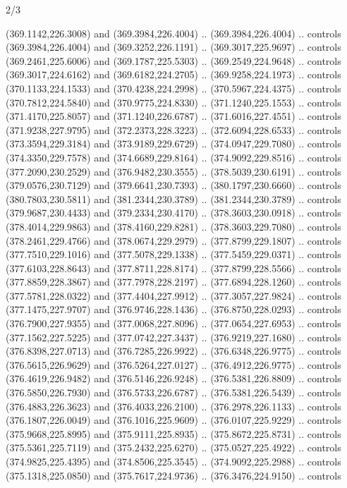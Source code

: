 \begin{flagdescription}{2/3}
\begin{scope}[xshift=0.5\flaglength,yshift=0.5\flagwidth,scale=\flagwidth/495.65]
\begin{scope}[y=0.8pt, x=0.8pt, yscale=-1,shift={(-463.76,-309.78)}]
  (369.1142,226.3008) and (369.3984,226.4004) .. (369.3984,226.4004) .. controls
  (369.3984,226.4004) and (369.3252,226.1191) .. (369.3017,225.9697) .. controls
  (369.2461,225.6006) and (369.1787,225.5303) .. (369.2549,224.9648) .. controls
  (369.3017,224.6162) and (369.6182,224.2705) .. (369.9258,224.1973) .. controls
  (370.1133,224.1533) and (370.4238,224.2998) .. (370.5967,224.4375) .. controls
  (370.7812,224.5840) and (370.9775,224.8330) .. (371.1240,225.1553) .. controls
  (371.4170,225.8057) and (371.1240,226.6787) .. (371.6016,227.4551) .. controls
  (371.9238,227.9795) and (372.2373,228.3223) .. (372.6094,228.6533) .. controls
  (373.3594,229.3184) and (373.9189,229.6729) .. (374.0947,229.7080) .. controls
  (374.3350,229.7578) and (374.6689,229.8164) .. (374.9092,229.8516) .. controls
  (377.2090,230.2529) and (376.9482,230.3555) .. (378.5039,230.6191) .. controls
  (379.0576,230.7129) and (379.6641,230.7393) .. (380.1797,230.6660) .. controls
  (380.7803,230.5811) and (381.2344,230.3789) .. (381.2344,230.3789) .. controls
  (379.9687,230.4433) and (379.2334,230.4170) .. (378.3603,230.0918) .. controls
  (378.4014,229.9863) and (378.4160,229.8281) .. (378.3603,229.7080) .. controls
  (378.2461,229.4766) and (378.0674,229.2979) .. (377.8799,229.1807) .. controls
  (377.7510,229.1016) and (377.5078,229.1338) .. (377.5459,229.0371) .. controls
  (377.6103,228.8643) and (377.8711,228.8174) .. (377.8799,228.5566) .. controls
  (377.8859,228.3867) and (377.7978,228.2197) .. (377.6894,228.1260) .. controls
  (377.5781,228.0322) and (377.4404,227.9912) .. (377.3057,227.9824) .. controls
  (377.1475,227.9707) and (376.9746,228.1436) .. (376.8750,228.0293) .. controls
  (376.7900,227.9355) and (377.0068,227.8096) .. (377.0654,227.6953) .. controls
  (377.1562,227.5225) and (377.0742,227.3437) .. (376.9219,227.1680) .. controls
  (376.8398,227.0713) and (376.7285,226.9922) .. (376.6348,226.9775) .. controls
  (376.5615,226.9629) and (376.5264,227.0127) .. (376.4912,226.9775) .. controls
  (376.4619,226.9482) and (376.5146,226.9248) .. (376.5381,226.8809) .. controls
  (376.5850,226.7930) and (376.5733,226.6787) .. (376.5381,226.5439) .. controls
  (376.4883,226.3623) and (376.4033,226.2100) .. (376.2978,226.1133) .. controls
  (376.1807,226.0049) and (376.1016,225.9609) .. (376.0107,225.9229) .. controls
  (375.9668,225.8995) and (375.9111,225.8935) .. (375.8672,225.8731) .. controls
  (375.5361,225.7119) and (375.2432,225.6270) .. (375.0527,225.4922) .. controls
  (374.9825,225.4395) and (374.8506,225.3545) .. (374.9092,225.2988) .. controls
  (375.1318,225.0850) and (375.7617,224.9736) .. (376.3476,224.9150) .. controls

\end{scope}
\end{scope}
\end{flagdescription}
